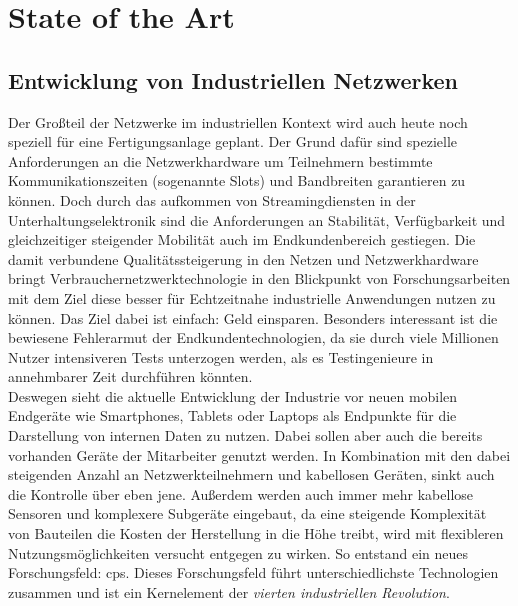 \chapter{State of the Art}
\section{Entwicklung von Industriellen Netzwerken}
Der Großteil der Netzwerke im industriellen Kontext wird auch heute noch speziell für eine Fertigungsanlage geplant. Der Grund dafür sind spezielle Anforderungen an die Netzwerkhardware um Teilnehmern bestimmte Kommunikationszeiten (sogenannte Slots) und Bandbreiten garantieren zu können. Doch durch das aufkommen von Streamingdiensten in der Unterhaltungselektronik sind die Anforderungen an Stabilität, Verfügbarkeit und gleichzeitiger steigender Mobilität auch im Endkundenbereich gestiegen. Die damit verbundene Qualitätssteigerung in den Netzen und Netzwerkhardware bringt Verbrauchernetzwerktechnologie in den Blickpunkt von Forschungsarbeiten mit dem Ziel diese besser für Echtzeitnahe industrielle Anwendungen nutzen zu können\cite{wollschlaeger2017future}. Das Ziel dabei ist einfach: Geld einsparen. Besonders interessant ist die bewiesene Fehlerarmut der Endkundentechnologien, da sie durch viele Millionen Nutzer intensiveren Tests unterzogen werden, als es Testingenieure in annehmbarer Zeit durchführen könnten.\\
Deswegen sieht die aktuelle Entwicklung der Industrie vor neuen mobilen Endgeräte wie Smartphones, Tablets oder Laptops als Endpunkte für die Darstellung von internen Daten zu nutzen. Dabei sollen aber auch die bereits vorhanden Geräte der Mitarbeiter genutzt werden\cite{french2014current}. In Kombination mit den dabei steigenden Anzahl an Netzwerkteilnehmern und kabellosen Geräten, sinkt auch die Kontrolle über eben jene. Außerdem werden auch immer mehr kabellose Sensoren und komplexere Subgeräte eingebaut, da eine steigende Komplexität von Bauteilen die Kosten der Herstellung in die Höhe treibt, wird mit flexibleren Nutzungsmöglichkeiten versucht entgegen zu wirken. So entstand ein neues Forschungsfeld: \acrlong{cps}. Dieses Forschungsfeld führt unterschiedlichste Technologien zusammen und ist ein Kernelement der \textit{vierten industriellen Revolution}.\\
